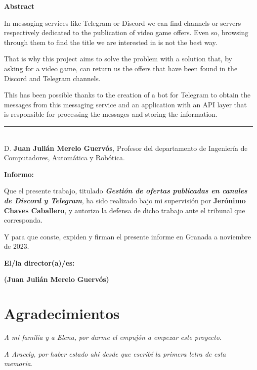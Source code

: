 \noindent\textbf{Abstract}

In messaging services like Telegram or Discord we can find channels or servers 
respectively dedicated to the publication of video game offers. Even so, browsing 
through them to find the title we are interested in is not the best way.

That is why this project aims to solve the problem with a solution that, by asking
for a video game, can return us the offers that have been found in the Discord and
Telegram channels.

This has been possible thanks to the creation of a bot for Telegram to obtain the
messages from this messaging service and an application with an API layer that is
responsible for processing the messages and storing the information.

\cleardoublepage

\thispagestyle{empty}

\noindent\rule[-1ex]{\textwidth}{2pt}\\[4.5ex]

D. \textbf{Juan Julián Merelo Guervós}, Profesor del  departamento de Ingeniería de Computadores, Automática y Robótica.

\vspace{0.5cm}

\textbf{Informo:}

\vspace{0.5cm}

Que el presente trabajo, titulado \textit{\textbf{Gestión de ofertas publicadas en canales de Discord y Telegram}},
ha sido realizado bajo mi supervisión por \textbf{Jerónimo Chaves Caballero}, y autorizo la defensa de dicho trabajo ante el tribunal
que corresponda.

\vspace{0.5cm}

Y para que conste, expiden y firman el presente informe en Granada a noviembre de 2023.

\vspace{1cm}

\textbf{El/la director(a)/es: }

\vspace{5cm}

\noindent \textbf{(Juan Julián Merelo Guervós)}

\chapter*{Agradecimientos}

\textit{A mi familia y a Elena, por darme el empujón a empezar este proyecto.}

\textit{A Aracely, por haber estado ahí desde que escribí la primera letra de esta memoria.}
